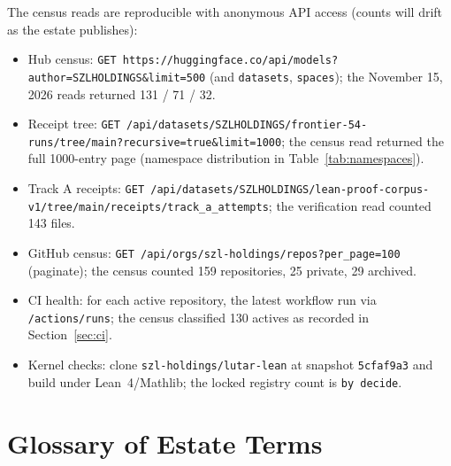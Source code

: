 The census reads are reproducible with anonymous API access (counts will drift as the estate publishes):
\begin{itemize}
\item Hub census: \texttt{GET https://huggingface.co/api/models?author=SZLHOLDINGS\&limit=500} (and \texttt{datasets}, \texttt{spaces}); the November 15, 2026 reads returned 131 / 71 / 32.
\item Receipt tree: \texttt{GET /api/datasets/SZLHOLDINGS/frontier-54-runs/tree/main?recursive=true\&limit=1000}; the census read returned the full 1000-entry page (namespace distribution in Table~\ref{tab:namespaces}).
\item Track A receipts: \texttt{GET /api/datasets/SZLHOLDINGS/lean-proof-corpus-v1/tree/main/receipts/track\_a\_attempts}; the verification read counted 143 files.
\item GitHub census: \texttt{GET /api/orgs/szl-holdings/repos?per\_page=100} (paginate); the census counted 159 repositories, 25 private, 29 archived.
\item CI health: for each active repository, the latest workflow run via \texttt{/actions/runs}; the census classified 130 actives as recorded in Section~\ref{sec:ci}.
\item Kernel checks: clone \texttt{szl-holdings/lutar-lean} at snapshot \texttt{5cfaf9a3} and build under Lean~4/Mathlib; the locked registry count is \texttt{by decide}.
\end{itemize}

\section{Glossary of Estate Terms}
\label{app:glossary}

